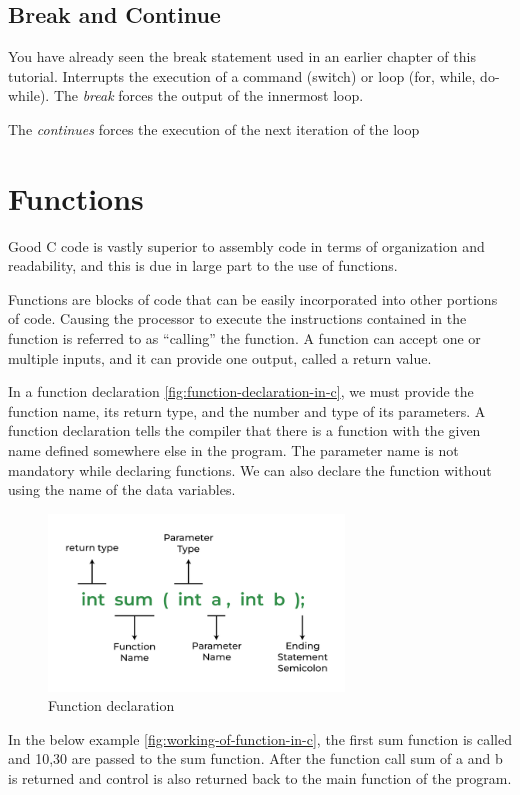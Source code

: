         \subsection{Break and Continue}    
            You have already seen the break statement used in an earlier chapter of this tutorial. Interrupts the execution of a command (switch) or loop (for, while, do-while). The \textit{break} forces the output of the innermost loop.

            The \textit{continues} forces the execution of the next iteration of the loop



    \section{Functions} \label{sec:section_cl.5}

        Good C code is vastly superior to assembly code in terms of organization and readability, and this is due in large part to the use of functions.
            
        Functions are blocks of code that can be easily incorporated into other portions of code. Causing the processor to execute the instructions contained in the function is referred to as “calling” the function. A function can accept one or multiple inputs, and it can provide one output, called a return value.

        In a function declaration \autoref{fig:function-declaration-in-c}, we must provide the function name, its return type, and the number and type of its parameters. A function declaration tells the compiler that there is a function with the given name defined somewhere else in the program.
        The parameter name is not mandatory while declaring functions. We can also declare the function without using the name of the data variables.

        \begin{figure}[!ht]
                \centering
                \captionsetup{justification=centering,margin=0.05cm}
                \includegraphics[width=0.7\textwidth]{figures/function-in-c.png}
                \caption{\label{fig:function-declaration-in-c}Function declaration}
        \end{figure}
        \vspace{0.5cm}
        In the below example \autoref{fig:working-of-function-in-c}, the first sum function is called and 10,30 are passed to the sum function. After the function call sum of a and b is returned and control is also returned back to the main function of the program.
        
